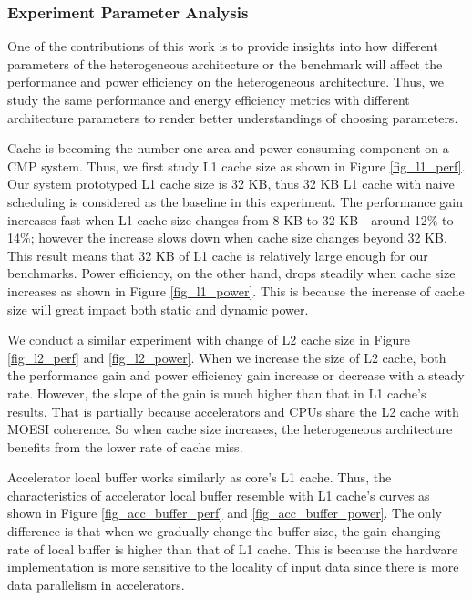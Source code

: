 \subsubsection{Experiment Parameter Analysis}
One of the contributions of this work is to provide insights into how different parameters of the heterogeneous architecture or the benchmark will affect the performance and power efficiency on the heterogeneous architecture. Thus, we study the same performance and energy efficiency metrics with different architecture parameters to render better understandings of choosing parameters. 

Cache is becoming the number one area and power consuming component on a CMP system. Thus, we first study L1 cache size as shown in Figure \ref{fig_l1_perf}. Our system prototyped L1 cache size is 32 KB, thus 32 KB L1 cache with naive scheduling is considered as the baseline in this experiment. The performance gain increases fast when L1 cache size changes from 8 KB to 32 KB - around 12\% to 14\%; however the increase slows down when cache size changes beyond 32 KB. This result means that 32 KB of L1 cache is relatively large enough for our benchmarks. Power efficiency, on the other hand, drops steadily when cache size increases as shown in Figure \ref{fig_l1_power}. This is because the increase of cache size will great impact both static and dynamic power. 

We conduct a similar experiment with change of L2 cache size in Figure \ref{fig_l2_perf} and \ref{fig_l2_power}. When we increase the size of L2 cache, both the performance gain and power efficiency gain increase or decrease with a steady rate. However, the slope of the gain is much higher than that in L1 cache's results. That is partially because accelerators and CPUs share the L2 cache with MOESI coherence. So when cache size increases, the heterogeneous architecture benefits from the lower rate of cache miss. 

Accelerator local buffer works similarly as core's L1 cache. Thus, the characteristics of accelerator local buffer resemble with L1 cache's curves as shown in Figure \ref{fig_acc_buffer_perf} and \ref{fig_acc_buffer_power}. The only difference is that when we gradually change the buffer size, the gain changing rate of local buffer is higher than that of L1 cache. This is because the hardware implementation is more sensitive to the locality of input data since there is more data parallelism in accelerators. 

